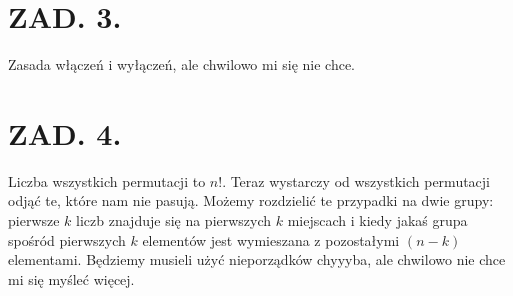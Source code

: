 \documentclass{article}[13pt]
\begin{document}
\section*{ZAD. 3.}

Zasada włączeń i wyłączeń, ale chwilowo mi się nie chce.

\section*{ZAD. 4.}

Liczba wszystkich permutacji to $n!$. Teraz wystarczy od wszystkich permutacji odjąć te, które nam nie pasują. Możemy rozdzielić te przypadki na dwie grupy: pierwsze $k$ liczb znajduje się na pierwszych $k$ miejscach i kiedy jakaś grupa spośród pierwszych $k$ elementów jest wymieszana z pozostałymi $(n-k)$ elementami. Będziemy musieli użyć nieporządków chyyyba, ale chwilowo nie chce mi się myśleć więcej. 
\end{document}
